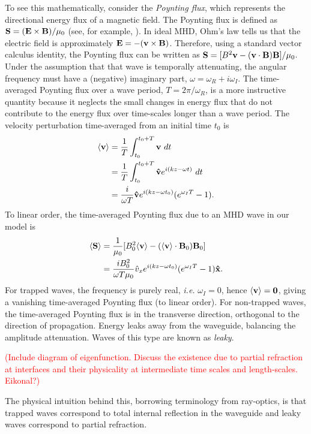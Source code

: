 \documentclass[12pt, draft]{../style-files/ociamthesis}
\begin{document}
To see this mathematically, consider the \textit{Poynting flux}, which represents the directional energy flux of a magnetic field. The Poynting flux is defined as $\mathbf{S} = (\mathbf{E} \times \mathbf{B})/\mu_0$ (see, for example, \citealp{pri14}). In ideal MHD, Ohm's law tells us that the electric field is approximately $\mathbf{E} = -(\mathbf{v} \times \mathbf{B})$. Therefore, using a standard vector calculus identity, the Poynting flux can be written as $\mathbf{S} = [B^2\mathbf{v} - (\mathbf{v} \cdot \mathbf{B})\mathbf{B}] / \mu_0$. Under the assumption that that wave is temporally attenuating, the angular frequency must have a (negative) imaginary part, $\omega = \omega_R + i\omega_I$. The time-averaged Poynting flux over a wave period, $T = 2\pi/\omega_R$, is a more instructive quantity because it neglects the small changes in energy flux that do not contribute to the energy flux over time-scales longer than a wave period. The velocity perturbation time-averaged from an initial time $t_0$ is
\begin{align}
	\langle \mathbf{v} \rangle &= \frac{1}{T} \int_{t_0}^{t_0 + T} \mathbf{v} ~dt \\
	&= \frac{1}{T} \int_{t_0}^{t_0 + T} \mathbf{\hat{v}} e^{i(kz - \omega t)} ~dt \\
	&= \frac{i}{\omega T} \mathbf{\hat{v}} e^{i(kz - \omega t_0)} (e^{\omega_I T} - 1).
\end{align}
To linear order, the time-averaged Poynting flux due to an MHD wave in our model is
\begin{align}
\langle \mathbf{S} \rangle &= \frac{1}{\mu_0}[B_0^2\langle\mathbf{v}\rangle - (\langle\mathbf{v}\rangle \cdot \mathbf{B}_0)\mathbf{B}_0] \\
&= \frac{iB_0^2}{\omega T \mu_0} \hat{v}_x e^{i(kz - \omega t_0)} (e^{\omega_I T} - 1) \mathbf{\hat{x}}.
\end{align}
For trapped waves, the frequency is purely real, \textit{i.e.} $\omega_I = 0$, hence $\langle \mathbf{v} \rangle = \mathbf{0}$, giving a vanishing time-averaged Poynting flux (to linear order). For non-trapped waves, the time-averaged Poynting flux is in the transverse direction, orthogonal to the direction of propagation. Energy leaks away from the waveguide, balancing the amplitude attenuation. Waves of this type are known as \textit{leaky}.

\textcolor{red}{(Include diagram of eigenfunction. Discuss the existence due to partial refraction at interfaces and their physicality at intermediate time scales and length-scales. Eikonal?)}

The physical intuition behind this, borrowing terminology from ray-optics, is that trapped waves correspond to total internal reflection in the waveguide and leaky waves correspond to partial refraction.
\end{document}
